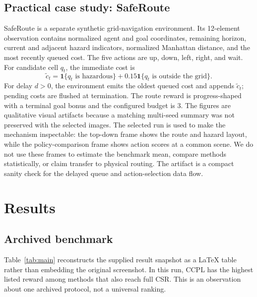 \documentclass[10pt]{article}
\begin{document}
\subsection{Practical case study: SafeRoute}
SafeRoute is a separate synthetic grid-navigation environment. Its 12-element
observation contains normalized agent and goal coordinates, remaining horizon,
current and adjacent hazard indicators, normalized Manhattan distance, and the
most recently queued cost. The five actions are up, down, left, right, and
wait. For candidate cell $q_t$, the immediate cost is
\begin{equation}
\tilde c_t=\mathbf{1}\{q_t\text{ is hazardous}\}+
0.15\mathbf{1}\{q_t\text{ is outside the grid}\}.
\end{equation}
For delay $d>0$, the environment emits the oldest queued cost and appends
$\tilde c_t$; pending costs are flushed at termination. The route reward is
progress-shaped with a terminal goal bonus and the configured budget is $3$.
The figures are qualitative visual artifacts because a matching multi-seed
summary was not preserved with the selected images. The selected run is used
to make the mechanism inspectable: the top-down frame shows the route and
hazard layout, while the policy-comparison frame shows action scores at a
common scene. We do not use these frames to estimate the benchmark mean,
compare methods statistically, or claim transfer to physical routing. The
artifact is a compact sanity check for the delayed queue and action-selection
data flow.

\section{Results}
\subsection{Archived benchmark}
Table~\ref{tab:main} reconstructs the supplied result snapshot as a LaTeX
table rather than embedding the original screenshot. In this run, CCPL has
the highest listed reward among methods that also reach full CSR. This is an
observation about one archived protocol, not a universal ranking.
\end{document}
